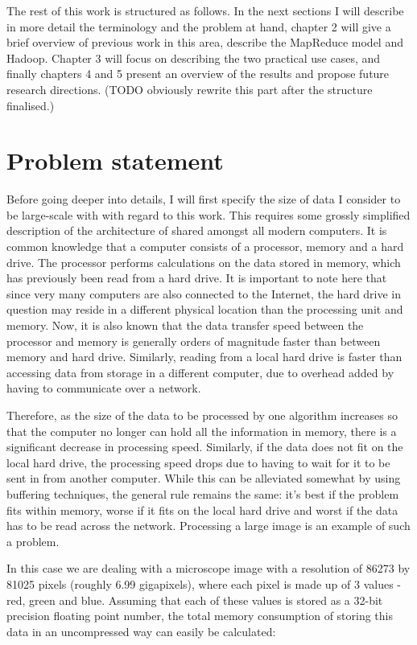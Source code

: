 \documentclass [12pt,a4paper]{report}
\begin{document}
The rest of this work is structured as follows. In the next sections I will describe in more detail the terminology and the problem at hand, chapter 2 will give a brief overview of previous work in this area, describe the MapReduce model and Hadoop. Chapter 3 will focus on describing the two practical use cases, and finally chapters 4 and 5 present an overview of the results and propose future research directions. (TODO obviously rewrite this part after the structure finalised.) %

\section{Problem statement}

Before going deeper into details, I will first specify the size of data I consider to be large-scale with with regard to this work. This requires some grossly simplified description of the architecture of shared amongst all modern computers. It is common knowledge that a computer consists of a processor, memory and a hard drive. The processor performs calculations on the data stored in memory, which has previously been read from a hard drive. It is important to note here that since very many computers are also connected to the Internet, the hard drive in question may reside in a different physical location than the processing unit and memory. Now, it is also known that the data transfer speed between the processor and memory is generally orders of magnitude faster than between memory and hard drive. Similarly, reading from a local hard drive is faster than accessing data from storage in a different computer, due to overhead added by having to communicate over a network.

Therefore, as the size of the data to be processed by one algorithm increases so that the computer no longer can hold all the information in memory, there is a significant decrease in processing speed. Similarly, if the data does not fit on the local hard drive, the processing speed drops due to having to wait for it to be sent in from another computer. While this can be alleviated somewhat by using buffering techniques, the general rule remains the same: it's best if the problem fits within memory, worse if it fits on the local hard drive and worst if the data has to be read across the network. Processing a large image is an example of such a problem.

In this case we are dealing with a microscope image with a resolution of 86273 by 81025 pixels (roughly 6.99 gigapixels), where each pixel is made up of 3 values - red, green and blue. Assuming that each of these values is stored as a 32-bit precision floating point number, the total memory consumption of storing this data in an uncompressed way can easily be calculated:
\end{document}
